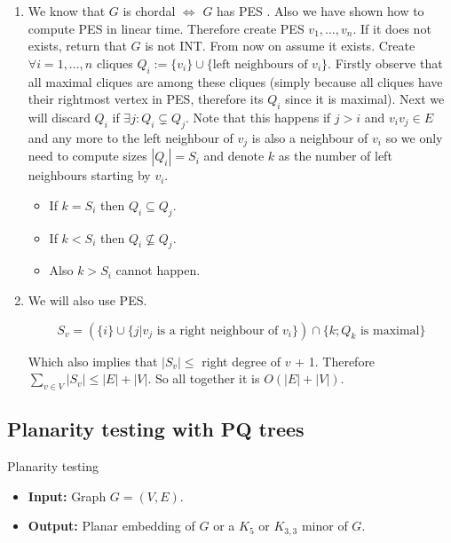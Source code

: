 \begin{enumerate}
	\item We know that $G$ is chordal $\iff$ $G$ has PES \PES. Also we have shown how to compute PES in linear time. Therefore create PES $v_{1}, \dots, v_{n}$. If it does not exists, return that $G$ is not INT. From now on assume it exists. Create $\forall i = 1, \dots, n$ cliques $Q_{i} := \{v_{i}\} \cup \{\text{left neighbours of } v_{i}\}$. Firstly observe that all maximal cliques are among these cliques (simply because all cliques have their rightmost vertex in PES, therefore its $Q_{i}$ since it is maximal). Next we will discard $Q_{i}$  if $\exists j : Q_{i} \subsetneq Q_{j}$. Note that this happens if $j > i$ and $v_{i}v_{j} \in E$ and any more to the left neighbour of $v_{j}$ is also a neighbour of $v_{i}$ so we only need to compute sizes $|Q_{i}| = S_{i}$ and denote $k$ as the number of left neighbours starting by $v_{i}$.
		\begin{itemize}
			\item If $k = S_{i}$ then $Q_{i} \subseteq Q_{j}$.
			\item If $k < S_{i}$ then $Q_{i} \nsubseteq Q_{j}$.
			\item Also $k > S_{i}$ cannot happen.
		\end{itemize}

	\item We will also use PES.

	$$
	S_{v} = (\{i\} \cup \{j | v_{j} \text{ is a right neighbour of } v_{i}\}) \cap \{k; Q_{k} \text{ is maximal}\}
	$$

	Which also implies that $|S_{v}| \leq$ right degree of $v$ + 1. Therefore $\sum_{v \in V} |S_{v}| \leq |E| + |V|$. So all together it is $O(|E| + |V|)$.
\end{enumerate}

\subsection{Planarity testing with PQ trees}

\begin{mybox}{Planarity testing}
	
\end{mybox}
\begin{itemize}[]
	\item \textbf{Input:} Graph $G = (V,E)$.
	\item \textbf{Output:} Planar embedding of $G$ or a $K_{5}$ or $K_{3,3}$ minor of $G$.
\end{itemize}

